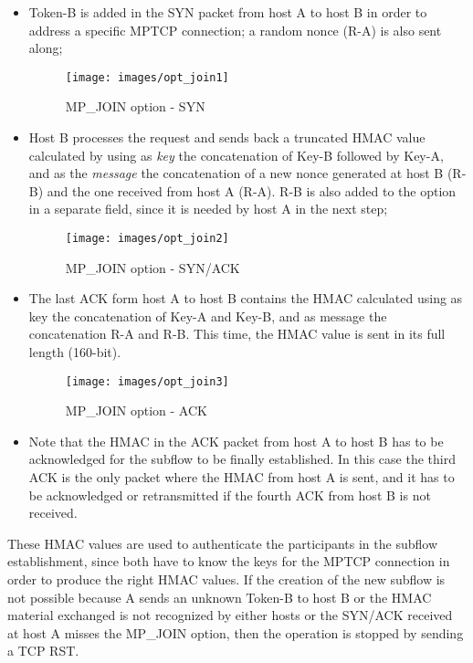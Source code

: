 \begin{itemize}
  \item Token-B is added in the SYN packet from host A to host B in order to address a specific MPTCP connection; a random nonce (R-A) is also sent along;
  
\begin{figure}[!htb]
\centering
\texttt{[image: images/opt\_join1]}
\caption{MP\_JOIN option - SYN}
\label{fig:opt_join1}
\end{figure}

  \item Host B processes the request and sends back a truncated HMAC value calculated by using as \textit{key} the concatenation of Key-B followed by Key-A, and as the \textit{message} the concatenation of a new nonce generated at host B (R-B) and the one received from host A (R-A). R-B is also added to the option in a separate field, since it is needed by host A in the next step;
  
\begin{figure}[!htb]
\centering
\texttt{[image: images/opt\_join2]}
\caption{MP\_JOIN option - SYN/ACK}
\label{fig:opt_join2}
\end{figure}

  \item The last ACK form host A to host B contains the HMAC calculated using as key the concatenation of Key-A and Key-B, and as message the concatenation R-A and R-B. This time, the HMAC value is sent in its full length (160-bit).
\begin{figure}[!htb]
\centering
\texttt{[image: images/opt\_join3]}
\caption{MP\_JOIN option - ACK}
\label{fig:opt_join3}
\end{figure}
  \item Note that the HMAC in the ACK packet from host A to host B has to be acknowledged for the subflow to be finally established. In this case the third ACK is the only packet where the HMAC from host A is sent, and it has to be acknowledged or retransmitted if the fourth ACK from host B is not received.
\end{itemize}

These HMAC values are used to authenticate the participants in the subflow establishment, since both have to know the keys for the MPTCP connection in order to produce the right HMAC values. If the creation of the new subflow is not possible because A sends an unknown Token-B to host B or the HMAC material exchanged is not recognized by either hosts or the SYN/ACK received at host A misses the MP\_JOIN option, then the operation is stopped by sending a TCP RST.

